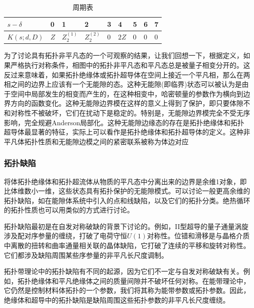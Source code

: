 \documentclass{article}
\numberwithin{equation}{subsection}
\begin{document}
\begin{table}[h]
    \centering
    \begin{tabular}{|l|l|l|l|l|l|l|l|l|}
    \hline
    $s-\delta$ & 0   & 1           & 2           & 3 & 4    & 5 & 6 & 7 \\ \hline
    $K(s;d,D)$ & $Z$ & $Z_2^{(1)}$ & $Z_2^{(2)}$ & 0 & $2Z$ & 0 & 0 & 0 \\ \hline
    \end{tabular}
    \caption{周期表}
\end{table}

为了讨论具有拓扑非平凡态的一个可观察的结果，让我们回想一下，根据定义，如果严格执行对称条件，相图中的拓扑非平凡态和平凡态总是被量子相变分开的。这反过来意味着，如果拓扑绝缘体或拓扑超导体在空间上接近一个平凡相，那么在两相之间的边界上应该有一个无能隙的态。这种无能隙(即临界)状态可以被认为是由于空间中局部发生的相变而产生的，在这种相变中，哈密顿量的参数作为横向到边界方向的函数变化。这种无能隙边界模在这样的意义上得到了保护，即只要体隙不和对称性不被破坏，它们在扰动下是稳定的。特别是，无能隙边界模完全不受无序影响，完全规避Anderson局部化。这种无能隙边缘态的存在是拓扑绝缘体和拓扑超导体最显著的特征，实际上可以看作是拓扑绝缘体和拓扑超导体的定义。这种非平凡体拓扑性质和无能隙边模之间的紧密联系被称为体边对应

\subsubsection{拓扑缺陷}
将体拓扑绝缘体和拓扑超流体从物质的平凡态中分离出来的边界是余维1对象，即比体维数小一维，这些状态具有拓扑保护的无能隙模式。可以讨论一般更高余维的拓扑缺陷，如在能隙体系统中引入的点和线缺陷，以及它们的拓扑分类。绝热循环的拓扑性质也可以用类似的方式进行讨论。

拓扑缺陷最初是在自发对称破缺的背景下讨论的。例如，II型超导的量子通量涡旋涉及配对序参量的缠绕，打破了电荷守恒$U(1)$对称性。位错和滑移是与晶格介质中离散的扭转和曲率通量相关联的晶体缺陷，它打破了连续的平移和旋转对称性。它们都涉及缺陷周围某些序参量的非平凡长尺度调制。

拓扑带理论中的拓扑缺陷有不同的起源，因为它们不一定与自发对称破缺有关。例如，拓扑绝缘体和平凡绝缘体之间的质量间隙并不破坏任何对称。在能带理论中，它仍然是控制材料体拓扑的一个参数，我们将其称为能带参数或拓扑参数。因此，绝缘体和超导中的拓扑缺陷是缺陷周围这些拓扑参数的非平凡长尺度缠绕。
\end{document}

